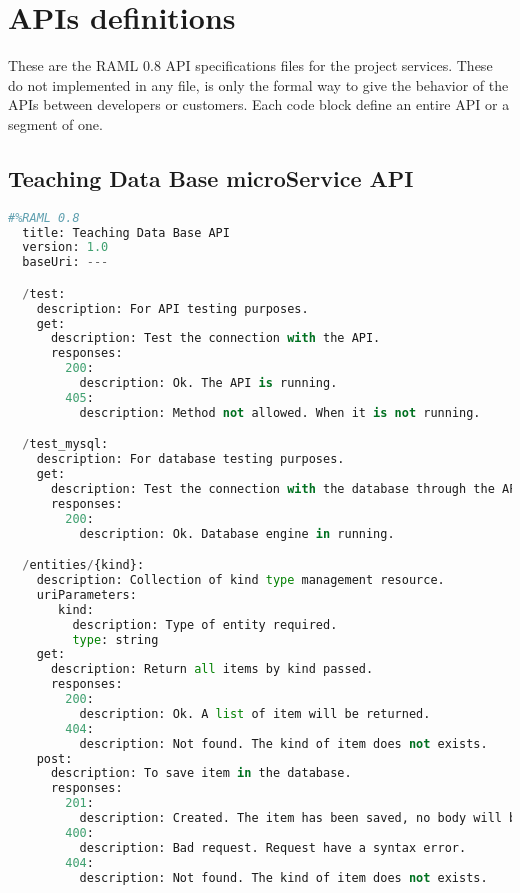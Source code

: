 \chapter{APIs definitions}

These are the RAML 0.8 API specifications files for the project services.
These do not implemented in any file, is only the formal way to give the behavior
of the APIs between developers or customers. Each code block define an entire
API or a segment of one.

\section{Teaching Data Base microService API}

\begin{lstlisting}[language=python,frame=none]
  #%RAML 0.8
  title: Teaching Data Base API
  version: 1.0
  baseUri: ---

  /test:
    description: For API testing purposes.
    get:
      description: Test the connection with the API.
      responses:
        200:
          description: Ok. The API is running.
        405:
          description: Method not allowed. When it is not running.

  /test_mysql:
    description: For database testing purposes.
    get:
      description: Test the connection with the database through the API.
      responses:
        200:
          description: Ok. Database engine in running.

  /entities/{kind}:
    description: Collection of kind type management resource.
    uriParameters:
       kind:
         description: Type of entity required.
         type: string
    get:
      description: Return all items by kind passed.
      responses:
        200:
          description: Ok. A list of item will be returned.
        404:
          description: Not found. The kind of item does not exists.
    post:
      description: To save item in the database.
      responses:
        201:
          description: Created. The item has been saved, no body will be returned.
        400:
          description: Bad request. Request have a syntax error.
        404:
          description: Not found. The kind of item does not exists.


\end{lstlisting}
